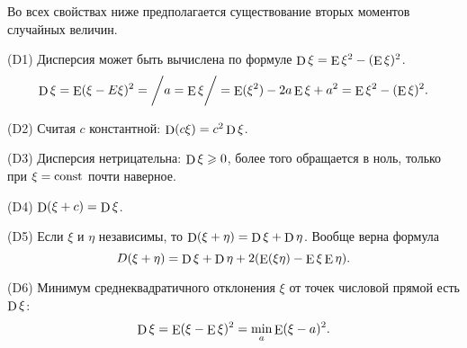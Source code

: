 Во всех свойствах ниже предполагается существование вторых моментов случайных величин.

(D1) 
Дисперсия может быть вычислена по формуле $\D \xi = \E \xi^2 - (\E \xi)^2$.
\begin{equation*}
    \D \xi = \E (\xi - E \xi)^2 = \bigg/
        a = \E \xi
    \bigg/ = \E (\xi^2) - 2 a \E \xi + a^2 = \E \xi^2 - (\E \xi)^2.
\end{equation*}

(D2)
Считая $c$ константной: $\D (c \xi) = c^2 \D \xi$. 

(D3)
Дисперсия нетрицательна: $\D \xi \geq 0$, более того обращается в ноль, только при $\xi = \const$ почти наверное. 

(D4)
$\D (\xi + c) = \D \xi$.

(D5)
Если $\xi$ и $\eta$ независимы, то $\D (\xi + \eta) = \D \xi + \D \eta$. Вообще верна формула
\begin{equation}
    D(\xi + \eta) = \D \xi + \D \eta + 2 (\E (\xi \eta) - \E \xi \E \eta).
\end{equation}

(D6)
Минимум среднеквадратичного отклонения $\xi$ от точек числовой прямой есть $\D \xi$:
\begin{equation*}
    \D \xi = \E (\xi - \E \xi)^2 = \min_a \E (\xi - a)^2.
\end{equation*}